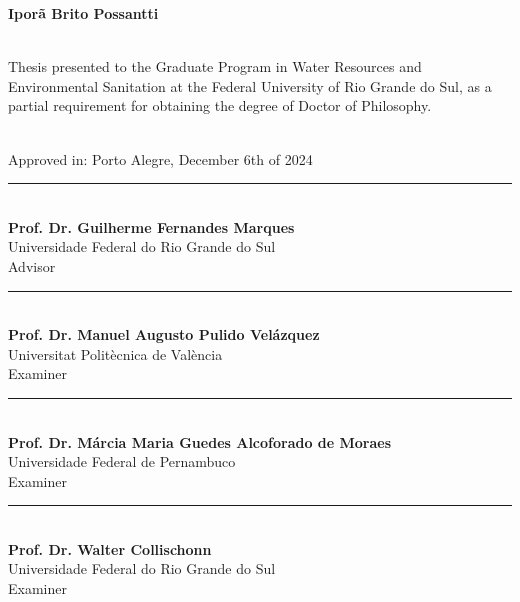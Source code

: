 \documentclass[./main_en.tex]{subfiles}
\begin{document}
\doublespacing %
\large

\newpage
\renewcommand{\headrulewidth}{0pt}
\thispagestyle{fancy}
\fancyhf{} %
\fancyfoot{} %
\fancyfoot[C]{\thepage}

\begin{center}
        \singlespacing
	\selectfont \textbf{Iporã Brito Possantti}\\	
	\vspace{5mm}
        \selectfont \docTitleEn\\
	\vspace{5mm}
\end{center}
\begin{adjustwidth}{150pt}{0pt}
    \singlespacing
    \small
    \selectfont Thesis presented to the Graduate Program in Water Resources and Environmental Sanitation at the Federal University of Rio Grande do Sul, as a partial requirement for obtaining the degree of Doctor of Philosophy. \\ \\ 
\end{adjustwidth}
\begin{center}
    \singlespacing
    \selectfont Approved in: Porto Alegre, December 6th of 2024\\
    \vspace{20mm}
    \rule{0.8\textwidth}{0.4pt} \\[1ex] %
    \selectfont \textbf{Prof. Dr. Guilherme Fernandes Marques} \\
    Universidade Federal do Rio Grande do Sul \\[1ex]
    Advisor \\[5ex]
    \rule{0.8\textwidth}{0.4pt} \\[0.5ex] %
    \selectfont \textbf{Prof. Dr. Manuel Augusto Pulido Velázquez}\\
    Universitat Politècnica de València \\[1ex]
    Examiner \\[5ex]
    \rule{0.8\textwidth}{0.4pt} \\[0.5ex] %
    \selectfont \textbf{Prof. Dr. Márcia Maria Guedes Alcoforado de Moraes}\\
    Universidade Federal de Pernambuco \\[1ex]
    Examiner \\[5ex]
    \rule{0.8\textwidth}{0.4pt} \\[0.5ex] %
    \selectfont \textbf{Prof. Dr. Walter Collischonn}\\
    Universidade Federal do Rio Grande do Sul \\[1ex]
    Examiner \\[4ex]
	
\end{center}


\clearpage
\end{document}
